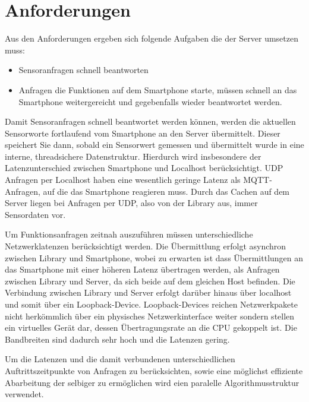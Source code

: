 \documentclass[11pt,a4paper]{report}
\begin{document}
\section{Anforderungen}
Aus den Anforderungen ergeben sich folgende Aufgaben die der Server umsetzen muss:
\begin{itemize}
\item Sensoranfragen schnell beantworten
\item Anfragen die Funktionen auf dem Smartphone starte, müssen schnell an das Smartphone weitergereicht und gegebenfalls wieder beantwortet werden.
\end{itemize}
Damit Sensoranfragen schnell beantwortet werden können, werden die aktuellen Sensorworte fortlaufend vom Smartphone an den Server übermittelt.
Dieser speichert Sie dann, sobald ein Sensorwert gemessen und übermittelt wurde in eine interne, threadsichere Datenstruktur.
Hierdurch wird insbesondere der Latenzunterschied zwischen Smartphone und Localhost berücksichtigt.
UDP Anfragen per Localhost haben eine wesentlich geringe Latenz als MQTT-Anfragen, auf die das Smartphone reagieren muss.
Durch das Cachen auf dem Server liegen bei Anfragen per UDP, also von der Library aus, immer Sensordaten vor.

Um Funktionsanfragen zeitnah auszuführen müssen unterschiedliche Netzwerklatenzen berücksichtigt werden.
Die Übermittlung erfolgt asynchron zwischen Library und Smartphone, wobei zu erwarten ist dass Übermittlungen an das Smartphone mit einer höheren Latenz übertragen werden, als Anfragen zwischen Library und Server, da sich beide auf dem gleichen Host befinden.
Die Verbindung zwischen Library und Server erfolgt darüber hinaus über localhost und somit über ein Loopback-Device.
Loopback-Devices reichen Netzwerkpakete nicht herkömmlich über ein physisches Netzwerkinterface weiter sondern stellen ein virtuelles Gerät dar, dessen Übertragungsrate an die CPU gekoppelt ist.
Die Bandbreiten sind dadurch sehr hoch und die Latenzen gering.

Um die Latenzen und die damit verbundenen unterschiedlichen Auftrittszeitpunkte von Anfragen zu berücksichten, sowie eine möglichst effiziente Abarbeitung der selbiger zu ermöglichen wird eien paralelle Algorithmusstruktur verwendet.
\end{document}
